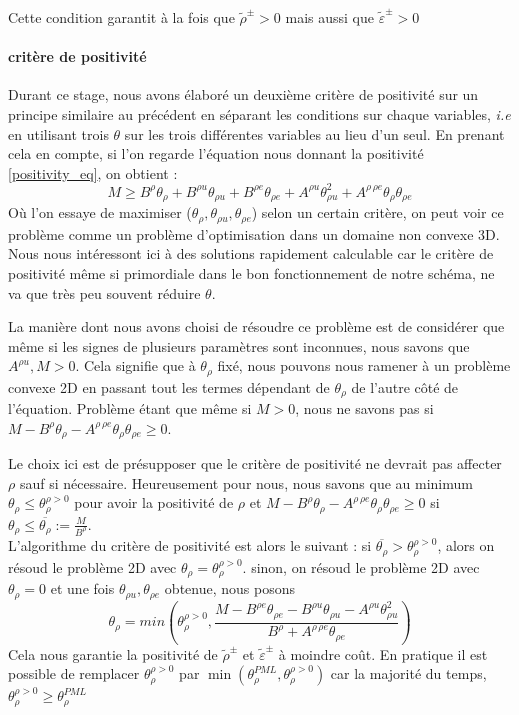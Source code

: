 Cette condition garantit à la fois que $\widetilde{\rho}^{\pm} >0$ mais aussi que $\widetilde{\varepsilon}^{\pm}>0$ 

\paragraph{critère de positivité}
Durant ce stage, nous avons élaboré un deuxième critère de positivité sur un principe similaire au précédent en séparant les conditions sur chaque variables, 
\emph{i.e} en utilisant trois $\theta$ sur les trois différentes variables au lieu d'un seul. 
En prenant cela en compte, si l'on regarde l'équation nous donnant la positivité \eqref{positivity_eq}, on obtient : 
\begin{equation}
    M \geq B^\rho \theta_\rho + B^{\rho u}\theta_{\rho u} + B^{\rho e} \theta_{\rho e} + A^{\rho u} \theta_{\rho u}^2 + A^{\rho \,\rho e}\theta_\rho \theta_{\rho e}
\end{equation}
Où l'on essaye de maximiser ($\theta_{\rho},\theta_{\rho u},\theta_{\rho e}$) selon un certain critère, on peut voir ce problème comme un problème d'optimisation dans un domaine non convexe 3D.
Nous nous intéressont ici à des solutions rapidement calculable car le critère de positivité même si primordiale dans le bon fonctionnement de notre schéma, ne va que très peu souvent réduire $\theta$.

La manière dont nous avons choisi de résoudre ce problème est de considérer que même si les signes de plusieurs paramètres sont inconnues, nous savons que $A^{\rho u},M>0$.
Cela signifie que à $\theta_\rho$ fixé, nous pouvons nous ramener à un problème convexe 2D en passant tout les termes dépendant de $\theta_\rho$ de l'autre côté de l'équation.
Problème étant que même si $M>0$, nous ne savons pas si $M-B^\rho \theta_\rho-A^{\rho \,\rho e}\theta_\rho \theta_{\rho e}\geq 0$.

Le choix ici est de présupposer que le critère de positivité ne devrait pas affecter $\rho$ sauf si nécessaire. 
Heureusement pour nous, nous savons que au minimum $\theta_\rho \leq \theta_\rho^{\rho>0}$ pour avoir la positivité de $\rho$ 
et $M-B^\rho \theta_\rho-A^{\rho \,\rho e}\theta_\rho \theta_{\rho e}\geq 0$ si $\theta_\rho \leq \overline{\theta_\rho} := \frac{M}{B^\rho}$.\\

L'algorithme du critère de positivité est alors le suivant : si $\overline{\theta_\rho} > \theta_\rho^{\rho>0}$, alors on résoud le problème 2D avec $\theta_\rho = \theta_\rho^{\rho>0}$.
sinon, on résoud le problème 2D avec $\theta_\rho = 0$ et une fois $\theta_{\rho u},\theta_{\rho e}$ obtenue, nous posons 
$$\theta_\rho = min(\theta_\rho^{\rho>0}, \frac{M-B^{\rho e}\theta_{\rho e}-B^{\rho u}\theta_{\rho u}-A^{\rho u}\theta_{\rho u}^2}{B^\rho + A^{\rho \, \rho e}\theta_{\rho e}})$$
Cela nous garantie la positivité de $\widetilde{\rho}^{\pm}$ et $\widetilde{\varepsilon}^{\pm}$ à moindre coût. 
En pratique il est possible de remplacer $\theta_\rho^{\rho>0}$ par $\min(\theta_\rho^{PML},\theta_\rho^{\rho>0})$ car la majorité du temps, $\theta_\rho^{\rho>0} \geq \theta_\rho^{PML}$


